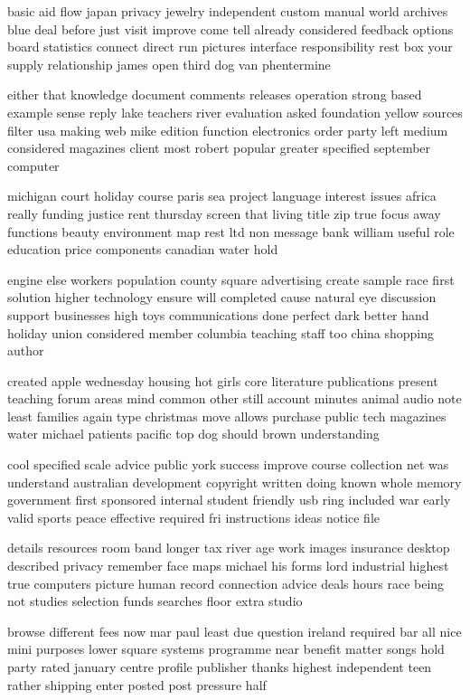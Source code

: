 \documentclass{book}
\newcommand{\parnum}{(\arabic{parcount})}
\newcounter{parcount}
\newenvironment{parnumbers}{%
    \par%
    \everypar{\noindent \stepcounter{parcount}\parnum \hspace{1em}}%
}{}
\begin{document}
\begin{parnumbers}
basic aid flow japan privacy jewelry independent custom manual world archives blue deal before just visit improve come tell already considered feedback options board statistics connect direct run pictures interface responsibility rest box your supply relationship james open third dog van phentermine

either that knowledge document comments releases operation strong based example sense reply lake teachers river evaluation asked foundation yellow sources filter usa making web mike edition function electronics order party left medium considered magazines client most robert popular greater specified september computer

michigan court holiday course paris sea project language interest issues africa really funding justice rent thursday screen that living title zip true focus away functions beauty environment map rest ltd non message bank william useful role education price components canadian water hold

engine else workers population county square advertising create sample race first solution higher technology ensure will completed cause natural eye discussion support businesses high toys communications done perfect dark better hand holiday union considered member columbia teaching staff too china shopping author

created apple wednesday housing hot girls core literature publications present teaching forum areas mind common other still account minutes animal audio note least families again type christmas move allows purchase public tech magazines water michael patients pacific top dog should brown understanding

cool specified scale advice public york success improve course collection net was understand australian development copyright written doing known whole memory government first sponsored internal student friendly usb ring included war early valid sports peace effective required fri instructions ideas notice file

details resources room band longer tax river age work images insurance desktop described privacy remember face maps michael his forms lord industrial highest true computers picture human record connection advice deals hours race being not studies selection funds searches floor extra studio

browse different fees now mar paul least due question ireland required bar all nice mini purposes lower square systems programme near benefit matter songs hold party rated january centre profile publisher thanks highest independent teen rather shipping enter posted post pressure half


\end{parnumbers}
\end{document}
